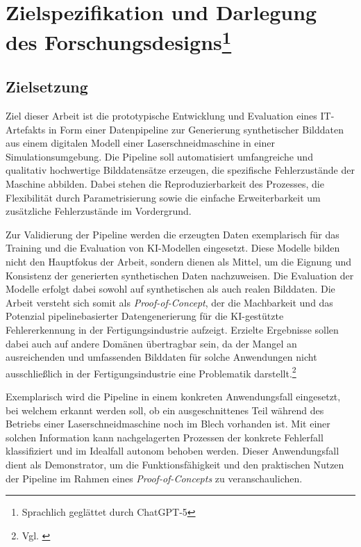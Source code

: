 \chapter[Zielspezifikation und Darlegung des Forschungsdesigns]{Zielspezifikation und Darlegung des Forschungsdesigns\footnote{Sprachlich geglättet durch ChatGPT-5}}
\label{chapter:Ziel_und_Forschungsdesign}

\section{Zielsetzung}\label{sec:zielsetzung}
Ziel dieser Arbeit ist die prototypische Entwicklung und Evaluation eines IT-Artefakts in Form einer Datenpipeline zur Generierung synthetischer Bilddaten aus einem digitalen Modell einer Laserschneidmaschine in einer Simulationsumgebung. Die Pipeline soll automatisiert umfangreiche und qualitativ hochwertige Bilddatensätze erzeugen, die spezifische Fehlerzustände der Maschine abbilden. Dabei stehen die Reproduzierbarkeit des Prozesses, die Flexibilität durch Parametrisierung sowie die einfache Erweiterbarkeit um zusätzliche Fehlerzustände im Vordergrund.

Zur Validierung der Pipeline werden die erzeugten Daten exemplarisch für das Training und die Evaluation von \ac{KI}-Modellen eingesetzt. Diese Modelle bilden nicht den Hauptfokus der Arbeit, sondern dienen als Mittel, um die Eignung und Konsistenz der generierten synthetischen Daten nachzuweisen. Die Evaluation der Modelle erfolgt dabei sowohl auf synthetischen als auch realen Bilddaten. Die Arbeit versteht sich somit als \textit{Proof-of-Concept}, der die Machbarkeit und das Potenzial pipelinebasierter Datengenerierung für die \ac{KI}-gestützte Fehlererkennung in der Fertigungsindustrie aufzeigt. Erzielte Ergebnisse sollen dabei auch auf andere Domänen übertragbar sein, da der Mangel an ausreichenden und umfassenden Bilddaten für solche Anwendungen nicht ausschließlich in der Fertigungsindustrie eine Problematik darstellt.\footnote{Vgl. \cite[2]{bai_bridging_2023}}

Exemplarisch wird die Pipeline in einem konkreten Anwendungsfall eingesetzt, bei welchem erkannt werden soll, ob ein ausgeschnittenes Teil während des Betriebs einer Laserschneidmaschine noch im Blech vorhanden ist. Mit einer solchen Information kann nachgelagerten Prozessen der konkrete Fehlerfall klassifiziert und im Idealfall autonom behoben werden. Dieser Anwendungsfall dient als Demonstrator, um die Funktionsfähigkeit und den praktischen Nutzen der Pipeline im Rahmen eines \textit{Proof-of-Concepts} zu veranschaulichen.


